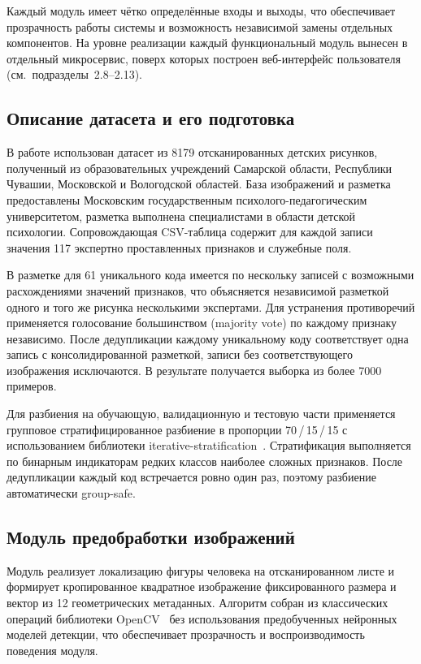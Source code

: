 Каждый модуль имеет чётко определённые входы и выходы, что обеспечивает прозрачность работы системы и возможность независимой замены отдельных компонентов. На уровне реализации каждый функциональный модуль вынесен в отдельный микросервис, поверх которых построен веб-интерфейс пользователя (см.~подразделы~2.8--2.13).

\subsection{Описание датасета и его подготовка}

В работе использован датасет из 8179 отсканированных детских рисунков, полученный из образовательных учреждений Самарской области, Республики Чувашии, Московской и Вологодской областей. База изображений и разметка предоставлены Московским государственным психолого-педагогическим университетом, разметка выполнена специалистами в области детской психологии. Сопровождающая CSV-таблица содержит для каждой записи значения 117 экспертно проставленных признаков и служебные поля.

В разметке для 61 уникального кода имеется по нескольку записей с возможными расхождениями значений признаков, что объясняется независимой разметкой одного и того же рисунка несколькими экспертами. Для устранения противоречий применяется голосование большинством (majority vote) по каждому признаку независимо. После дедупликации каждому уникальному коду соответствует одна запись с консолидированной разметкой, записи без соответствующего изображения исключаются. В результате получается выборка из более 7000 примеров.

Для разбиения на обучающую, валидационную и тестовую части применяется групповое стратифицированное разбиение в пропорции 70\,/\,15\,/\,15 с использованием библиотеки iterative-stratification~\cite{iterstrat}. Стратификация выполняется по бинарным индикаторам редких классов наиболее сложных признаков. После дедупликации каждый код встречается ровно один раз, поэтому разбиение автоматически group-safe.

\subsection{Модуль предобработки изображений}

Модуль реализует локализацию фигуры человека на отсканированном листе и формирует кропированное квадратное изображение фиксированного размера и вектор из 12 геометрических метаданных. Алгоритм собран из классических операций библиотеки OpenCV~\cite{opencv} без использования предобученных нейронных моделей детекции, что обеспечивает прозрачность и воспроизводимость поведения модуля.

